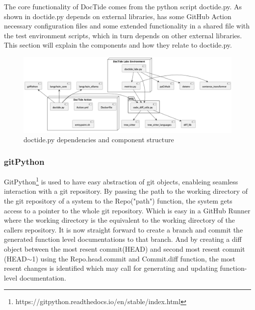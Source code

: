 The core functionality of DocTide comes from the python script doctide.py. As shown in  doctide.py depends on external libraries, has some GitHub Action necessary configuration files and some extended functionality in a shared file with the test environment scripts, which in turn depends on other external libraries. This section will explain the components and how they relate to doctide.py.

\begin{figure}[H]
\centering
\includegraphics[width=1\linewidth]{Figures/component_diagram.png}
\caption{doctide.py dependencies and component structure}
\label{fig:components}
\end{figure}
\subsubsection*{gitPython}
GitPython\footnote{https://gitpython.readthedocs.io/en/stable/index.html} is used to have easy abstraction of git objects, enableing seamless interaction with a git repository. By passing the path to the working directory of the git repository of a system to the Repo("path") function, the system gets access to a pointer to the whole git repository. Which is easy in a GitHub Runner where the working directory is the equivalent to the working directory of the callers repository. It is now straight forward to create a branch and commit the generated function level documentations to that branch. And by creating a diff object between the most resent commit(HEAD) and second most resent commit (HEAD\(\sim \)1) using the Repo.head.commit and Commit.diff function, the most resent changes is identified which may call for generating and updating function-level documentation.
